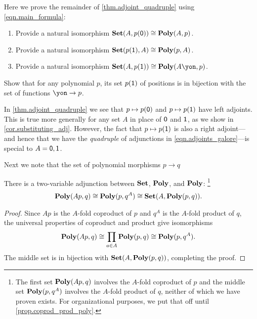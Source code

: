 \documentclass[DynamicalBook]{subfiles}
\begin{document}
\begin{exercise}\label{exc.adjoint_quadruple}
Here we prove the remainder of \cref{thm.adjoint_quadruple} using \cref{eqn.main_formula}:
\begin{enumerate}
	\item Provide a natural isomorphism $\textbf{Set}(A,p(\textsf{0}))\cong\textbf{Poly}(A,p)$.
	\item Provide a natural isomorphism $\textbf{Set}(p(\textsf{1}),A)\cong\textbf{Poly}(p,A)$.
	\item Provide a natural isomorphism $\smset(A,p(\1))\cong\poly(A\yon,p)$.
\qedhere
\end{enumerate}
\end{exercise}

\begin{exercise}\label{exc.positions_maps_yon}
Show that for any polynomial $p$, its set $p(\textsf{1})$ of positions is in bijection with the set of functions $\yon\to p$.
\end{exercise}

In \cref{thm.adjoint_quadruple} we see that $p\mapsto p(\textsf{0})$ and $p\mapsto p(\textsf{1})$ have left adjoints. This is true more generally for any set $A$ in place of $\textsf{0}$ and $\textsf{1}$, as we show in \cref{cor.substituting_adj}. However, the fact that $p\mapsto p(\textsf{1})$ is also a right adjoint---and hence that we have the \emph{quadruple} of adjunctions in \eqref{eqn.adjoints_galore}---is special to $A=\textsf{0},\textsf{1}$.

Next we note that the set of polynomial morphisms $p\to q$ 

\begin{proposition}\label{prop.two_var_adj}
There is a two-variable adjunction between $\textbf{Set}$, $\textbf{Poly}$, and $\textbf{Poly}$:%
\footnote{The first set $\textbf{Poly}(Ap,q)$ involves the $A$-fold coproduct of $p$ and the middle set $\textbf{Poly}(p,q^A)$ involves the $A$-fold product of $q$, neither of which we have proven exists. For organizational purposes, we put that off until \cref{prop.coprod_prod_poly}.
}
\begin{align}\label{eqn.two_var_adj}
\textbf{Poly}(Ap,q)\cong\textbf{Poly}(p,q^A)\cong\textbf{Set}(A,\textbf{Poly}(p,q)).
\end{align}
\end{proposition}
\begin{proof}
Since $Ap$ is the $A$-fold coproduct of $p$ and $q^A$ is the $A$-fold product of $q$, the universal properties of coproduct and product give isomorphisms
\[\textbf{Poly}(Ap,q)\cong\prod_{a\in A}\textbf{Poly}(p,q)\cong\textbf{Poly}(p,q^A).\]
The middle set is in bijection with $\textbf{Set}(A,\textbf{Poly}(p,q))$, completing the proof.
\end{proof}
\end{document}
